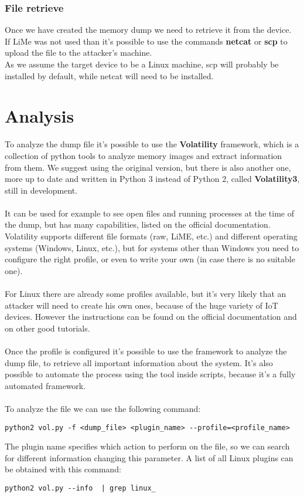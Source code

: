 \subsubsection{File retrieve}
Once we have created the memory dump we need to retrieve it from the device.\\
If LiMe was not used than it's possible to use the commands \textbf{netcat}\cite{netcat} or \textbf{scp}\cite{scp}
to upload the file to the attacker's machine.\\
As we assume the target device to be a Linux machine, scp will probably be installed
by default, while netcat will need to be installed.
\section{Analysis}
To analyze the dump file it's possible to use the \textbf{Volatility}\cite{volatility} framework, which is a collection
of python tools to analyze memory images and extract information from them.
We suggest using the original version, but there is also another one, more up
to date and written in Python 3 instead of Python 2, called \textbf{Volatility3}\cite{volatility3},
still in development.\\\\
It can be used for example to see open files and running processes at the time of the dump, but
has many capabilities, listed on the official documentation. Volatility supports
different file formats (raw, LiME, etc.) and different operating systems (Windows, Linux, etc.),
but for systems other than Windows you need to configure the right profile,
or even to write your own (in case there is no suitable one).\\\\
For Linux there are already some profiles available, but it's very likely that
an attacker will need to create his own ones, because of the huge variety of 
IoT devices. However the instructions can be found on the official documentation
and on other good tutorials\cite{volatility-conf}\cite{volatility-tutorial}.\\\\
Once the profile is configured it's possible to use the framework to analyze the dump file, to
retrieve all important information about the system. It's also possible to 
automate the process using the tool inside scripts, because it's a fully automated
framework.\\\\
To analyze the file we can use the following command:
\begin{lstlisting}[numbers=none]
    python2 vol.py -f <dump_file> <plugin_name> --profile=<profile_name>
\end{lstlisting}
The plugin name specifies which action to perform on the file, so we can
search for different information changing this parameter. A list of all Linux plugins can be
obtained with this command:
\begin{lstlisting}[numbers=none]
    python2 vol.py --info  | grep linux_
\end{lstlisting}
\newpage